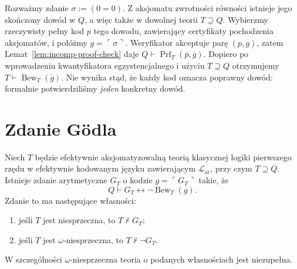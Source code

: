 \begin{przyklad}
Rozważmy zdanie $\sigma:=(0=0)$. Z aksjomatu zwrotności
równości istnieje jego skończony dowód w $Q$, a więc także
w dowolnej teorii $T\supseteq Q$. Wybierzmy rzeczywisty
pełny kod $p$ tego dowodu, zawierający certyfikaty
pochodzenia aksjomatów, i połóżmy
$g=\ulcorner\sigma\urcorner$. Weryfikator akceptuje parę
$(p,g)$, zatem Lemat~\ref{lem:incomp-proof-check} daje
$Q\vdash\operatorname{Prf}_T(\overline p,\overline g)$.
Dopiero po wprowadzeniu kwantyfikatora egzystencjalnego
i użyciu $T\supseteq Q$ otrzymujemy
$T\vdash\operatorname{Bew}_T(\overline g)$.
Nie wynika stąd, że każdy kod oznacza poprawny dowód:
formalnie potwierdziliśmy \emph{jeden} konkretny dowód.
\end{przyklad}

\section{Zdanie Gödla}
\begin{twierdzenie}\label{thm:godel-first-original}
Niech $T$ będzie efektywnie aksjomatyzowalną teorią
klasycznej logiki pierwszego rzędu w efektywnie kodowanym
języku zawierającym $\mathcal L_{\mathrm{ar}}$, przy czym
$T\supseteq Q$.
Istnieje zdanie arytmetyczne $G_T$ o kodzie
$g=\ulcorner G_T\urcorner$ takie, że
\[
 Q\vdash G_T\leftrightarrow
  \neg\operatorname{Bew}_T(\overline g).
\]
Zdanie to ma następujące własności:
\begin{enumerate}[label=(\alph*)]
\item jeśli $T$ jest niesprzeczna, to $T\nvdash G_T$;
\item jeśli $T$ jest $\omega$-niesprzeczna, to $T\nvdash\neg G_T$.
\end{enumerate}
W szczególności $\omega$-niesprzeczna teoria o podanych
własnościach jest niezupełna.
\end{twierdzenie}
